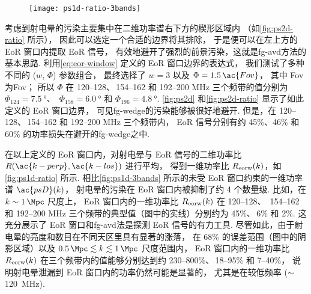 \begin{figure}[htp]
  \centering
  \texttt{[image: ps1d-ratio-3bands]}
  \label{fig:ps1d-ratio}
\end{figure}

考虑到射电晕的污染主要集中在二维功率谱右下方的楔形区域内
（如\autoref{fig:ps2d-ratio} 所示），
因此可以选定一个合适的边界将其排除，
于是便可以在左上方的 EoR 窗口内提取 EoR 信号，
有效地避开了强烈的前景污染，这就是\ac{fg-avd}方法的基本思路.
利用\autoref{eq:eor-window} 定义的 EoR 窗口边界的表达式，
我们测试了多种不同的 ($w$, $\Phi$) 参数组合，
最终选择了 $w = 3$ 以及 $\Phi = 1.5\,\ac{Fov}$，
其中 \ac{Fov} 为\acl{Fov}；
所以 $\Phi$ 在 \numrange{120}{128}、\,\numrange{154}{162}
和 \numrange{192}{200} \si{\MHz} 三个频带的值分别为
$\Phi_{124} = \SI{7.5}{\degree}$、\,
$\Phi_{158} = \SI{6.0}{\degree}$ 和
$\Phi_{196} = \SI{4.8}{\degree}$.
\autoref{fig:ps2d} 和\autoref{fig:ps2d-ratio} 显示了如此定义的 EoR 窗口边界，
可见\ac{fg-wedge}的污染能够被很好地避开.
但是，在 \numrange{120}{128}、\,\numrange{154}{162}
和 \numrange{192}{200} \si{\MHz} 三个频带内，
EoR 信号分别有约 45\%、46\% 和 60\% 的功率损失在避开的\ac{fg-wedge}之中.

在以上定义的 EoR 窗口内，对射电晕与 EoR 信号的二维功率比 
$R(\ac{k-perp}, \ac{k-los})$ 进行平均，
得到一维功率比 $R_{\mathrm{eorw}}(k)$，如\autoref{fig:ps1d-ratio} 所示.
相比\autoref{fig:ps1d-3bands} 所示的未受 EoR 窗口约束的一维功率谱 $\ac{psD}(k)$，
射电晕的污染在 EoR 窗口内被抑制了约 4 个数量级.
比如，在 $k \sim \SI{1}{\per\Mpc}$ 尺度上，
EoR 窗口内的一维功率比 $R_{\mathrm{eorw}}(k)$ 在 \numrange{120}{128}、\,
\numrange{154}{162} 和 \numrange{192}{200} \si{\MHz}
三个频带的典型值（图中的实线）分别约为 45\%、\,6\% 和 2\%.
这充分展示了 EoR 窗口和\ac{fg-avd}法是探测 EoR 信号的有力工具.
尽管如此，由于射电晕的亮度和数目在不同天区里具有显著的涨落，
在 68\% 的误差范围（图中的阴影区域）以及
$\SI{0.5}{\per\Mpc} \lesssim k \lesssim \SI{1}{\per\Mpc}$ 尺度范围内，
EoR 窗口内的一维功率比 $R_{\mathrm{eorw}}(k)$ 在三个频带内的值能够分别达到约
\numrange{230}{800}\%、\,\numrange{18}{95}\% 和 \numrange{7}{40}\%，
说明射电晕泄漏到 EoR 窗口内的功率仍然可能是显著的，
尤其是在较低频率 ($\sim$\,\SI{120}{\MHz}).

